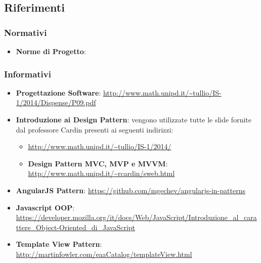 	\subsection{Riferimenti} %
	\label{sub:riferimenti}
		\subsubsection{Normativi} %
		\label{ssub:normativi}
			\begin{itemize}
				\item \textbf{Norme di Progetto}: \docNameVersionNdP
			\end{itemize}

		\subsubsection{Informativi} %
		\label{ssub:informativi}
			\begin{itemize}
				\item \textbf{Progettazione Software}: \url{http://www.math.unipd.it/~tullio/IS-1/2014/Dispense/P09.pdf}
				\item \textbf{Introduzione ai Design Pattern}: vengono utilizzate tutte le slide fornite dal professore Cardin presenti ai seguenti indirizzi:
					\begin{itemize}
						\item \url{http://www.math.unipd.it/~tullio/IS-1/2014/}
						\item \textbf{Design Pattern MVC, MVP e MVVM}: \url{http://www.math.unipd.it/~rcardin/sweb.html}
					\end{itemize}
				\item \textbf{AngularJS Pattern}: \url{https://github.com/mgechev/angularjs-in-patterns}
				\item \textbf{Javascript OOP}: \url{https://developer.mozilla.org/it/docs/Web/JavaScript/Introduzione_al_carattere_Object-Oriented_di_JavaScript}
				\item \textbf{Template View Pattern}: \url{http://martinfowler.com/eaaCatalog/templateView.html}
			\end{itemize}
